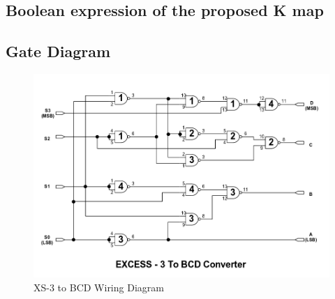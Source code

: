 \documentclass[11pt,a4paper]{article}
\begin{document}
\subsection{Boolean expression of the proposed K map}
\subsection{Gate Diagram}
\begin{figure}[H]
    \centering
    \includegraphics[width=7in]{XS3-BCD.png}
    \caption{XS-3 to BCD Wiring Diagram}
\end{figure}
\end{document}
